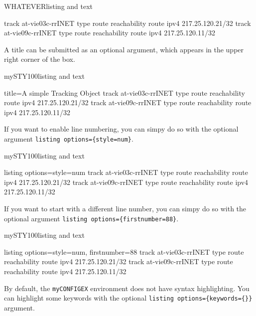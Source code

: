 \documentclass[]{myHOWTO-V001}
\begin{document}
\begin{myTEXEXdoclst}{WHATEVER}{listing and text}
\begin{myCONFIGEX}{}
track at-vie03c-rrINET type route reachability route ipv4 217.25.120.21/32
track at-vie09c-rrINET type route reachability route ipv4 217.25.120.11/32
\end{myCONFIGEX}
\end{myTEXEXdoclst}

A title can be submitted as an optional argument, which appears in the upper right corner of the box.

\begin{myTEXEXdoclst}{mySTY100}{listing and text}
\begin{myCONFIGEX}{title={A simple Tracking Object}}
track at-vie03c-rrINET type route reachability route ipv4 217.25.120.21/32
track at-vie09c-rrINET type route reachability route ipv4 217.25.120.11/32
\end{myCONFIGEX}
\end{myTEXEXdoclst}

If you want to enable line numbering, you can simpy do so with the optional argument \verb|listing options={style=num}|.

\begin{myTEXEXdoclst}{mySTY100}{listing and text}
\begin{myCONFIGEX}{listing options={style=num}}
track at-vie03c-rrINET type route reachability route ipv4 217.25.120.21/32
track at-vie09c-rrINET type route reachability route ipv4 217.25.120.11/32
\end{myCONFIGEX}
\end{myTEXEXdoclst}

If you want to start with a different line number, you can simpy do so with the optional argument \verb|listing options={firstnumber=88}|.

\begin{myTEXEXdoclst}{mySTY100}{listing and text}
\begin{myCONFIGEX}{listing options={style=num, firstnumber=88}}
track at-vie03c-rrINET type route reachability route ipv4 217.25.120.21/32
track at-vie09c-rrINET type route reachability route ipv4 217.25.120.11/32
\end{myCONFIGEX}
\end{myTEXEXdoclst}

By default, the \Verb|myCONFIGEX| environment does not have syntax highlighting. You can highlight some keywords with the optional \verb|listing options={keywords={}}| argument.
\end{document}
